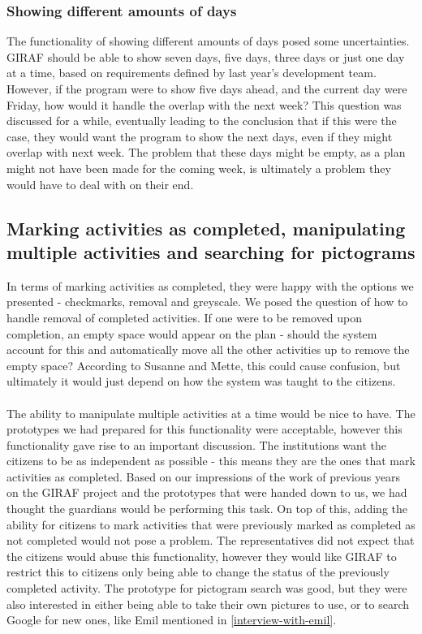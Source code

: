 \subsubsection{Showing different amounts of days}
The functionality of showing different amounts of days posed some uncertainties. 
GIRAF should be able to show seven days, five days, three days or just one day at a time, based on requirements defined by last year's development team.
However, if the program were to show five days ahead, and the current day were Friday, how would it handle the overlap with the next week?
This question was discussed for a while, eventually leading to the conclusion that if this were the case, they would want the program to show the next days, even if they might overlap with next week.
The problem that these days might be empty, as a plan might not have been made for the coming week, is ultimately a problem they would have to deal with on their end.

\subsection{Marking activities as completed, manipulating multiple activities and searching for pictograms}
In terms of marking activities as completed, they were happy with the options we presented - checkmarks, removal and greyscale. 
We posed the question of how to handle removal of completed activities.
If one were to be removed upon completion, an empty space would appear on the plan - should the system account for this and automatically move all the other activities up to remove the empty space?
According to Susanne and Mette, this could cause confusion, but ultimately it would just depend on how the system was taught to the citizens.
\\\\
The ability to manipulate multiple activities at a time would be nice to have. 
The prototypes we had prepared for this functionality were acceptable, however this functionality gave rise to an important discussion.
The institutions want the citizens to be as independent as possible - this means they are the ones that mark activities as completed.
Based on our impressions of the work of previous years on the GIRAF project and the prototypes that were handed down to us, we had thought the guardians would be performing this task.
On top of this, adding the ability for citizens to mark activities that were previously marked as completed as not completed would not pose a problem.
The representatives did not expect that the citizens would abuse this functionality, however they would like GIRAF to restrict this to citizens only being able to change the status of the previously completed activity.   
The prototype for pictogram search was good, but they were also interested in either being able to take their own pictures to use, or to search Google for new ones, like Emil mentioned in \ref{interview-with-emil}.

